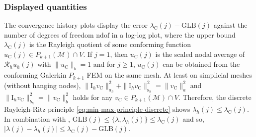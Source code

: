 \documentclass[a4paper]{amsart}
\numberwithin{equation}{section}
\newcommand{\I}{\mathrm{I}}
\newcommand{\Mcal}{\mathcal{M}}
\newcommand{\s}{\mathrm{s}}
\theoremstyle{remark}
\theoremstyle{definition}
\theoremstyle{assumptionnoperiod}
\begin{document}
\subsubsection{Displayed quantities}
The convergence history plots display the error $\lambda_\mathrm{C}(j) - \mathrm{GLB}(j)$ against the number of degrees of freedom $\mathrm{ndof}$ in a log-log plot, where the upper bound $\lambda_\mathrm{C}(j)$ is the Rayleigh quotient of some conforming function $u_\mathrm{C}(j) \in P_{k+1}(\Mcal) \cap V$.
If $j = 1$, then $u_\mathrm{C}(j)$ is the scaled nodal average of $\mathcal{R}_h u_h(j)$ with $\|u_\mathrm{C}\|_b = 1$
and for $j \geq 1$, $u_\mathrm{C}(j)$ can be obtained from 
the conforming Galerkin $P_{k+1}$ FEM on the same mesh.
At least on simplicial meshes (without hanging nodes), $\|\I_h v_\mathrm{C}\|_{a_h}^2 + \|\I_h v_\mathrm{C}\|_{\s_h}^2 = \|v_\mathrm{C}\|_a^2$ and $\|\I_h v_\mathrm{C}\|_{b_h}^2 = \|v_\mathrm{C}\|_b^2$ holds for any $v_\mathrm{C} \in P_{k+1}(\Mcal) \cap V$. Therefore, the discrete Rayleigh-Ritz principle \eqref{eq:min-max-principle-discrete} shows $\lambda_h(j) \leq \lambda_\mathrm{C}(j)$.
In combination with , $\mathrm{GLB}(j) \leq \{\lambda, \lambda_h(j)\} \leq \lambda_\mathrm{C}(j)$ and so, $|\lambda(j) - \lambda_h(j)| \leq \lambda_\mathrm{C}(j) - \mathrm{GLB}(j)$.
\end{document}

